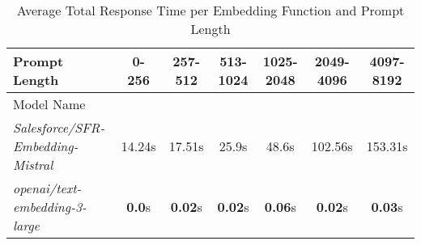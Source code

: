 
\begin{table}[H]
\centering
\scriptsize
\begin{tabular}{@{}lcccccc@{}}
\toprule
Prompt Length & 0-256 & 257-512 & 513-1024 & 1025-2048 & 2049-4096 & 4097-8192 \\
\midrule
Model Name &  &  &  &  &  &  \\
\textit{Salesforce/SFR-Embedding-Mistral} & 14.24s & 17.51s & 25.9s & 48.6s & 102.56s & 153.31s \\
\textit{openai/text-embedding-3-large} & \textbf{0.0}s & \textbf{0.02}s & \textbf{0.02}s & \textbf{0.06}s & \textbf{0.02}s & \textbf{0.03}s \\

\bottomrule
\end{tabular}
\caption{Average Total Response Time per Embedding Function and Prompt Length}
\label{tab:response_time_by_length}
\end{table}
